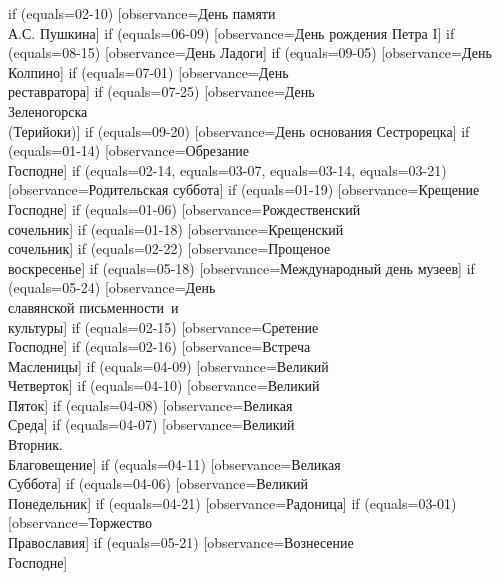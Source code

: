 {  if (equals=02-10) [observance=День памяти\\ А.С. Пушкина]
  if (equals=06-09) [observance=День рождения Петра I]
  if (equals=08-15) [observance=День Ладоги]
  if (equals=09-05) [observance=День Колпино]
  if (equals=07-01) [observance=День\\ реставратора]
  if (equals=07-25) [observance=День\\ Зеленогорска\\ (Терийоки)]
  if (equals=09-20) [observance=День основания Сестрорецка]
  if (equals=01-14) [observance=Обрезание\\ Господне]
  if (equals=02-14,
  	equals=03-07,
	equals=03-14,
	equals=03-21) [observance=Родительская суббота]
  if (equals=01-19) [observance=Крещение\\ Господне]
  if (equals=01-06) [observance=Рождественский\\ сочельник]
  if (equals=01-18) [observance=Крещенский\\ сочельник]
  if (equals=02-22) [observance=Прощеное\\ воскресенье]
  if (equals=05-18) [observance=Международный день музеев]
  if (equals=05-24) [observance=День\\ славянской письменности~и\\культуры]
  if (equals=02-15) [observance=Сретение\\ Господне]
  if (equals=02-16) [observance=Встреча\\ Масленицы]
  if (equals=04-09) [observance=Великий\\ Четверток]
  if (equals=04-10) [observance=Великий\\ Пяток]
  if (equals=04-08) [observance=Великая\\ Среда]
  if (equals=04-07) [observance=Великий\\ Вторник.\\ Благовещение]
  if (equals=04-11) [observance=Великая\\ Суббота]
  if (equals=04-06) [observance=Великий\\ Понедельник]
  if (equals=04-21) [observance=Радоница]
  if (equals=03-01) [observance=Торжество\\ Православия]
  if (equals=05-21) [observance=Вознесение\\ Господне]
}
